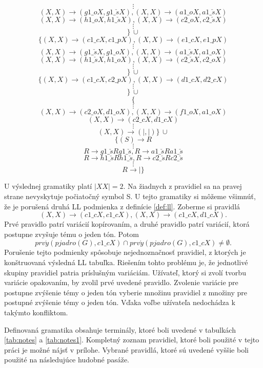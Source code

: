 \begin{definition}
$$\vdots$$
$$(X,X) \rightarrow (g1\_oX, g1\_\check{s}X), (X,X) \rightarrow (a1\_oX, a1\_\check{s}X)$$
$$(X,X) \rightarrow (h1\_oX, h1\_\check{s}X), (X,X) \rightarrow (c2\_oX, c2\_\check{s}X)$$
$$\vdots$$
$$\}\, \cup$$
$$\{(X,X) \rightarrow (c1\_cX, c1\_pX), (X,X) \rightarrow (e1\_cX, e1\_pX)$$
$$\vdots$$
$$(X,X) \rightarrow (g1\_\check{s}X, g1\_oX), (X,X) \rightarrow (a1\_\check{s}X, a1\_oX)$$
$$(X,X) \rightarrow (h1\_\check{s}X, h1\_oX), (X,X) \rightarrow (c2\_\check{s}X, c2\_oX)$$
$$\vdots$$
$$\}\, \cup$$
$$\{(X,X) \rightarrow (c1\_cX, c2\_pX), (X,X) \rightarrow (d1\_cX, d2\_cX)$$
$$\vdots$$
$$\}\, \cup$$
$$\{$$
$$\vdots$$
$$(X,X) \rightarrow (c2\_oX, d1\_oX), (X,X) \rightarrow (f1\_oX, a1\_oX)$$
$$(X,X) \rightarrow (c2\_cX, d1\_cX)$$
$$\vdots$$
$$(X,X) \rightarrow (|, |)\}\, \cup$$
$$\{(S) \rightarrow R$$
$$\vdots$$
$$R \rightarrow g1\_\check{s}Rg1\_\check{s}, R \rightarrow a1\_\check{s}Ra1\_\check{s}$$
$$R \rightarrow h1\_\check{s}Rh1\_\check{s}, R \rightarrow c2\_\check{s}Rc2\_\check{s}$$
$$\vdots$$
$$R \rightarrow |\}$$

U výslednej gramatiky platí $|XX| = 2$. Na žiadnych z pravidiel sa na pravej strane nevyskytuje počiatočný symbol S. U tejto gramatiky si môžeme všimnúť, že je porušená druhá LL podmienka z definície \ref{def:ll}. Zoberme si pravidlá $$(X,X) \rightarrow (c1\_cX, c1\_cX), (X,X) \rightarrow (c1\_cX, d1\_cX).$$ Prvé pravidlo patrí variácií kopírovaním, a druhé pravidlo patrí variácií, ktorá postupne zvyšuje tému o jeden tón. Potom $$prv\acute{y}(pjadro(G),c1\_cX) \cap prv\acute{y}(pjadro(G),c1\_cX) \neq \emptyset.$$ Porušenie tejto podmienky spôsobuje nejednoznačnosť pravidiel, z ktorých je konštruovaná výsledná LL tabuľka. Riešením tohto problému je, že jednotlivé skupiny pravidiel patria príslušným variáciám. Užívateľ, ktorý si zvolí tvorbu variácie opakovaním, by zvolil prvé uvedené pravidlo. Zvolenie variácie pre postupne zvýšenie témy o jeden tón vyberie množinu pravidiel z množiny pre postupné zvýšenie témy o jeden tón. Vďaka voľbe užívateľa nedochádza k takýmto konfliktom.
\end{definition}

Definovaná gramatika obsahuje terminály, ktoré boli uvedené v tabulkách \ref{tab:notes} a \ref{tab:notes1}. Kompletný zoznam pravidiel, ktoré boli použité v tejto práci je možné nájsť v prílohe. Vybrané pravidlá, ktoré sú uvedené vyššie boli použité na následujúce hudobné pasáže.

